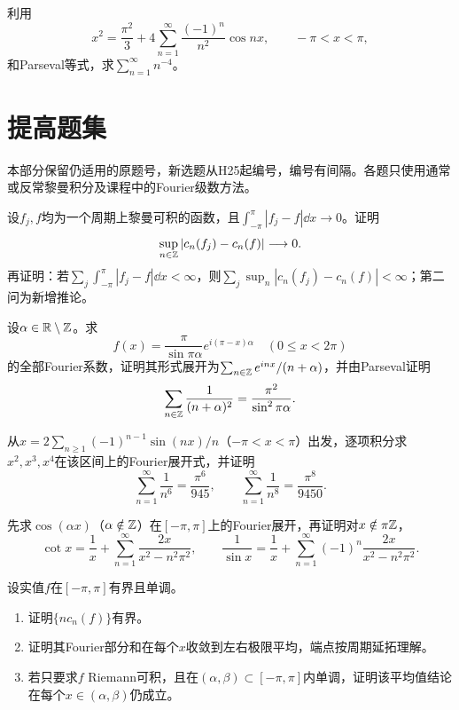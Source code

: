 利用
\[
 x^2=\frac{\pi^2}{3}+4\sum_{n=1}^{\infty}
                         \frac{(-1)^n}{n^2}\cos nx,
 \qquad -\pi<x<\pi,
\]
和Parseval等式，求$\sum_{n=1}^{\infty}n^{-4}$。

\section{提高题集}
本部分保留仍适用的原题号，新选题从H25起编号，编号有间隔。各题只使用通常或反常黎曼积分及课程中的Fourier级数方法。

设$f_j,f$均为一个周期上黎曼可积的函数，且$\int_{-\pi}^{\pi}|f_j-f|\dd x\to0$。证明
\[
 \sup_{n\in\mathbb Z}|c_n(f_j)-c_n(f)|\longrightarrow0.
\]
再证明：若$\sum_j\int_{-\pi}^{\pi}|f_j-f|\dd x<\infty$，则$\sum_j\sup_n|c_n(f_j)-c_n(f)|<\infty$；第二问为新增推论。

设$\alpha\in\mathbb R\setminus\mathbb Z$。求
\[
 f(x)=\frac\pi{\sin\pi\alpha}e^{i(\pi-x)\alpha}\quad(0\le x<2\pi)
\]
的全部Fourier系数，证明其形式展开为$\sum_{n\in\mathbb Z}e^{inx}/(n+\alpha)$，并由Parseval证明
\[
 \sum_{n\in\mathbb Z}\frac1{(n+\alpha)^2}=\frac{\pi^2}{\sin^2\pi\alpha}.
\]

从$x=2\sum_{n\ge1}(-1)^{n-1}\sin(nx)/n$（$-\pi<x<\pi$）出发，逐项积分求$x^2,x^3,x^4$在该区间上的Fourier展开式，并证明
\[
 \sum_{n=1}^{\infty}\frac1{n^6}=\frac{\pi^6}{945},\qquad
 \sum_{n=1}^{\infty}\frac1{n^8}=\frac{\pi^8}{9450}.
\]

先求$\cos(\alpha x)$（$\alpha\notin\mathbb Z$）在$[-\pi,\pi]$上的Fourier展开，再证明对$x\notin\pi\mathbb Z$，
\[
 \cot x=\frac1x+\sum_{n=1}^{\infty}\frac{2x}{x^2-n^2\pi^2},
 \qquad
 \frac1{\sin x}=\frac1x+\sum_{n=1}^{\infty}(-1)^n\frac{2x}{x^2-n^2\pi^2}.
\]

设实值$f$在$[-\pi,\pi]$有界且单调。
\begin{enumerate}[label=(\arabic*)]
\item 证明$\{nc_n(f)\}$有界。
\item 证明其Fourier部分和在每个$x$收敛到左右极限平均，端点按周期延拓理解。
\item 若只要求$f$ Riemann可积，且在$(\alpha,\beta)\subset[-\pi,\pi]$内单调，证明该平均值结论在每个$x\in(\alpha,\beta)$仍成立。
\end{enumerate}

